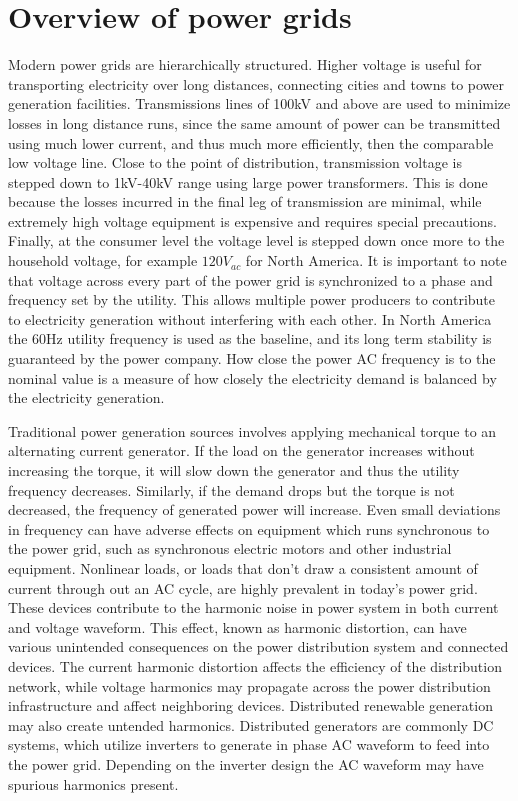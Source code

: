 \section{Overview of power grids}
Modern power grids are hierarchically structured. Higher voltage is useful for transporting electricity over long distances, connecting cities and towns to power generation facilities. Transmissions lines of 100kV and above are used to minimize losses in long distance runs, since the same amount of power can be transmitted using much lower current, and thus much more efficiently, then the comparable low voltage line. Close to the point of distribution, transmission voltage is stepped down to 1kV-40kV range using large power transformers. This is done because the losses incurred in the final leg of transmission are minimal, while extremely high voltage equipment is expensive and requires special precautions.\cite{sivanagaraju2008electric} Finally, at the consumer level the voltage level is stepped down once more to the household voltage, for example $120V_{ac}$ for North America. It is important to note that voltage across every part of the power grid is synchronized to a phase and frequency set by the utility. This allows multiple power producers to contribute to electricity generation without interfering with each other.\cite{blaabjerg2006overview} In North America the 60Hz utility frequency is used as the baseline, and its long term stability is guaranteed by the power company. How close the power AC frequency is to the nominal value is a measure of how closely the electricity demand is balanced by the electricity generation. 

Traditional power generation sources involves applying mechanical torque to an alternating current generator. If the load on the generator increases without increasing the torque, it will slow down the generator and thus the utility frequency decreases. Similarly, if the demand drops but the torque is not decreased, the frequency of generated power will increase. Even small deviations in frequency can have adverse effects on equipment which runs synchronous to the power grid, such as synchronous electric motors and other industrial equipment.\cite{morren2006wind} Nonlinear loads, or loads that don't draw a consistent amount of current through out an AC cycle, are highly prevalent in today's power grid. These devices contribute to the harmonic noise in power system in both current and voltage waveform. This effect, known as harmonic distortion, can have various unintended consequences on the power distribution system and connected devices. The current harmonic distortion affects the efficiency of the distribution network, while voltage harmonics may propagate across the power distribution infrastructure and affect neighboring devices.\cite{muhamad2007effects} Distributed renewable generation may also create untended harmonics. Distributed generators are commonly DC systems, which utilize inverters to generate in phase AC waveform to feed into the power grid. Depending on the inverter design the AC waveform may have spurious harmonics present.\cite{morren2006wind} 

